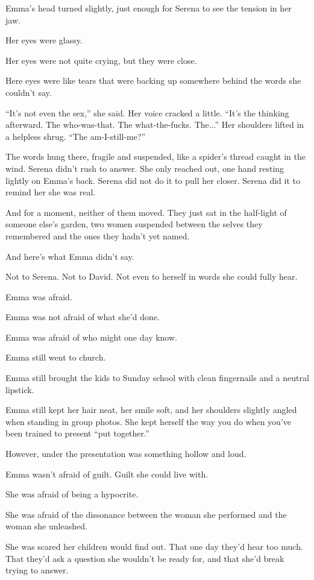 Emma’s head turned slightly, just enough for Serena to see the tension in her jaw. 

Her eyes were glassy. 

Her eyes were not quite crying, but they were close. 

Here eyes were like tears that were backing up somewhere behind the words she couldn’t 
say. 

``It’s not even the sex,'' she said. Her voice cracked a little. ``It’s the thinking afterward. The 
who-was-that. The what-the-fucks. The...'' Her shoulders lifted in a helpless shrug. ``The am-I-still-me?''

The words hung there, fragile and suspended, like a spider’s thread caught in the wind. Serena didn’t 
rush to answer. She only reached out, one hand resting lightly on Emma’s back. Serena did not do it 
to pull her closer. Serena did it to remind her she was real.

And for a moment, neither of them moved. They just sat in the half-light of someone else’s garden, 
two women suspended between the selves they remembered and the ones they hadn’t yet named.

And here’s what Emma didn’t say.

Not to Serena.
Not to David.
Not even to herself in words she could fully hear.

Emma was afraid. 

Emma was not afraid of what she’d done.

Emma was afraid of who might one day know.

Emma still went to church.

Emma still brought the kids to Sunday school with clean fingernails and a neutral lipstick.

Emma still kept her hair neat, her smile soft, and her shoulders slightly angled when standing in group 
photos. She kept herself the way you do when you’ve been trained to present ``put together.''

However, under the presentation was something hollow and loud.

Emma wasn’t afraid of guilt. Guilt she could live with.

She was afraid of being a hypocrite.

She was afraid of the dissonance between the woman she performed and the woman she unleashed.

She was scared her children would find out.
That one day they’d hear too much. That they'd ask a question she wouldn't be ready 
for, and that she'd break trying to answer.

